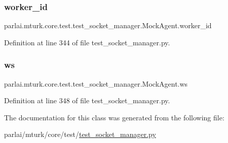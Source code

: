 \subsubsection{\texorpdfstring{worker\+\_\+id}{worker\_id}}
{\footnotesize\ttfamily parlai.\+mturk.\+core.\+test.\+test\+\_\+socket\+\_\+manager.\+Mock\+Agent.\+worker\+\_\+id}



Definition at line 344 of file test\+\_\+socket\+\_\+manager.\+py.

\mbox{\label{classparlai_1_1mturk_1_1core_1_1test_1_1test__socket__manager_1_1MockAgent_a7040472ab9040d5ea6c74defc5816fcd}} 
\subsubsection{\texorpdfstring{ws}{ws}}
{\footnotesize\ttfamily parlai.\+mturk.\+core.\+test.\+test\+\_\+socket\+\_\+manager.\+Mock\+Agent.\+ws}



Definition at line 348 of file test\+\_\+socket\+\_\+manager.\+py.



The documentation for this class was generated from the following file\+:\begin{DoxyCompactItemize}
\item 
parlai/mturk/core/test/\hyperlink{test_2test__socket__manager_8py}{test\+\_\+socket\+\_\+manager.\+py}\end{DoxyCompactItemize}
